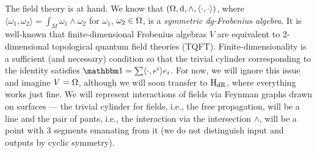 \documentclass[\MainFolder/Text.tex]{subfiles}
\begin{document}
The field theory is at hand. We know that $(\Omega,\mathrm{d},\wedge,\langle\cdot,\cdot\rangle)$, where $\langle\omega_1,\omega_2\rangle = \int_M \omega_1 \wedge \omega_2$ for $\omega_1$, $\omega_2\in \Omega$, is a \emph{symmetric dg-Frobenius algebra}. It is well-known that finite-dimensional Frobenius algebras $V$ are equivalent to $2$-dimensional topological quantum field theories (TQFT). Finite-dimensionality is a sufficient (and necessary) condition so that the trivial cylinder corresponding to the identity satisfies $\Id = \sum \langle \cdot,e^i\rangle e_i$. For now, we will ignore this issue and imagine $V=\Omega$, although we will soon transfer to $\mathrm{H}_{\mathrm{dR}}$, where everything works just fine.
We will represent interactions of fields via Feynman graphs drawn on surfaces --- the trivial cylinder for fields, i.e., the free propagation, will be a line and the pair of pants, i.e., the interaction via the intersection $\wedge$, will be a point with $3$ segments emanating from it (we do not distinguish input and outputs by cyclic symmetry).
\end{document}
